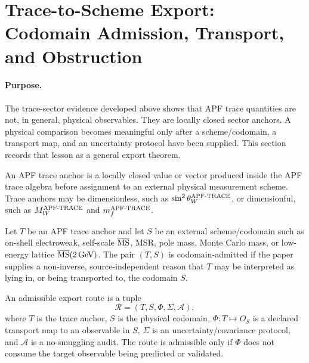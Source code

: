 
\section{Trace-to-Scheme Export: Codomain Admission, Transport, and Obstruction}
\label{sec:trace-to-scheme-export}

\paragraph{Purpose.}
The trace-sector evidence developed above shows that APF trace quantities are not, in general, physical observables.  They are locally closed sector anchors.  A physical comparison becomes meaningful only after a scheme/codomain, a transport map, and an uncertainty protocol have been supplied.  This section records that lesson as a general export theorem.

\begin{definition}
An APF trace anchor is a locally closed value or vector produced inside the APF trace algebra before assignment to an external physical measurement scheme.  Trace anchors may be dimensionless, such as $\sin^2\theta_W^{\rm APF\text{-}TRACE}$, or dimensionful, such as $M_W^{\rm APF\text{-}TRACE}$ and $m_f^{\rm APF\text{-}TRACE}$.
\end{definition}

\begin{definition}
Let $T$ be an APF trace anchor and let $S$ be an external scheme/codomain such as on-shell electroweak, self-scale $\overline{\rm MS}$, MSR, pole mass, Monte Carlo mass, or low-energy lattice $\overline{\rm MS}(2\,\mathrm{GeV})$.  The pair $(T,S)$ is codomain-admitted if the paper supplies a non-inverse, source-independent reason that $T$ may be interpreted as lying in, or being transported to, the codomain $S$.
\end{definition}

\begin{definition}
An admissible export route is a tuple
\[
\mathcal R=(T,S,\Phi,\Sigma,\mathcal A),
\]
where $T$ is the trace anchor, $S$ is the physical codomain, $\Phi:T\mapsto O_S$ is a declared transport map to an observable in $S$, $\Sigma$ is an uncertainty/covariance protocol, and $\mathcal A$ is a no-smuggling audit.  The route is admissible only if $\Phi$ does not consume the target observable being predicted or validated.
\end{definition}

